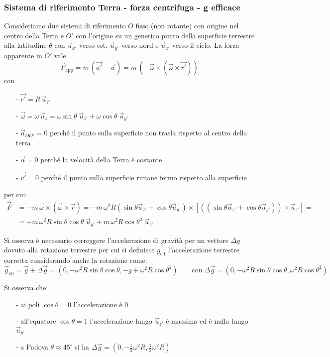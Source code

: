 \documentclass[a4paper]{article}
\newcommand\uz{\vec{u}_z}
\newcommand\uxp{\vec{u}_{x'}}
\newcommand\uyp{\vec{u}_{y'}}
\newcommand\uzp{\vec{u}_{z'}}
\begin{document}
\subsubsection*{Sistema di riferimento Terra - forza centrifuga - g efficace}
Consideriamo due sistemi di riferimento \(O\) fisso (non rotante) con origine nel centro della Terra e \(O'\) con l'origine su un
generico punto della superficie terrestre alla latitudine \(\theta\) con \(\uxp\) verso est, \(\uyp\) verso nord e \(\uzp\) verso
il cielo. La forza apparente in \(O'\) vale
\[\vec{F}_\text{app} = m \, (\vec{a'} - \vec{a}) = m \, (-\vec{\omega} \times (\vec{\omega} \times \vec{r'}))\]
con \begin{itemize}[topsep=3pt, itemsep=0pt]
	\item[-] \(\vec{r'} = R \, \uzp\)
	\item[-] \(\vec{\omega} = \omega \, \uz = \omega \sin \theta \; \uzp + \omega \cos \theta \; \uyp\)
	\item[-] \(\vec{a}_{OO'} = 0\) perché il punto sulla superficie non trasla rispetto al centro della terra
	\item[-] \(\vec{\alpha} = 0\) perché la velocità della Terra è costante
	\item[-] \(\vec{v'} = 0\) perché il punto sulla superficie rimane fermo rispetto alla superficie
\end{itemize}
per cui:
\begin{align*}
	\vec{F} &= -m \, \vec{\omega} \times (\vec{\omega} \times \vec{r}) = - m \, \omega^2 R (\sin \theta \uzp + \cos \theta \uyp) \times [((\sin \theta \uzp + \cos \theta \uyp)) \times \uzp] = \\ 
	&= -m \, \omega^2 R \sin \theta \cos \theta \; \uyp + m \, \omega^2 R {\cos \theta}^2 \; \uzp
\end{align*}

Si osserva è necessario correggere l'accelerazione di gravità per un vettore \(\Delta g\) dovuto alla rotazione terrestre per cui
si definisce \(g_\text{eff}\) l'accelerazione terrestre corretta considerando anche la rotazione come:
\[\vec{g}_\text{eff} = \vec{g} + \Delta \vec{g} = (0, -\omega^2 R \sin \theta \cos \theta, -g + \omega^2 R {\cos \theta}^2) \qquad \text{con} \; \Delta \vec{g} = (0, -\omega^2 R \sin \theta \cos \theta, \omega^2 R {\cos \theta}^2)\]

Si osserva che:
\begin{itemize}[topsep=3pt, itemsep=0pt]
	\item[-] ai poli \(\cos \theta = 0\) l'accelerazione è 0
	\item[-] all'equatore \(\cos \theta = 1\) l'accelerazione lungo \(\uzp\) è massima ed è nulla lungo \(\uyp\)
	\item[-] a Padova \(\theta \approx 45^\circ\) si ha \(\Delta \vec{g} = (0, -\frac{1}{2}\omega^2 R, \frac{1}{2} \omega^2 R)\)
\end{itemize}
\end{document}

